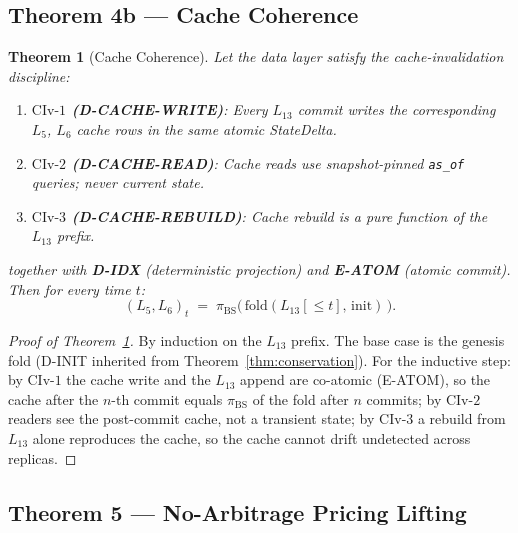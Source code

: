 \documentclass[11pt,a4paper]{article}
\newtheorem{theorem}[definition]{Theorem}
\begin{document}
\subsection{Theorem 4b --- Cache Coherence}
\label{sec:thm-cache}

\begin{theorem}[Cache Coherence]
\label{thm:cache-coh}
Let the data layer satisfy the cache-invalidation discipline:
\begin{enumerate}[nosep]
\item \textbf{$\mathrm{CIv}\textrm{-}1$ (D-CACHE-WRITE)}: Every $L_{13}$ commit writes the corresponding $L_5$, $L_6$ cache rows in the same atomic StateDelta.
\item \textbf{$\mathrm{CIv}\textrm{-}2$ (D-CACHE-READ)}: Cache reads use snapshot-pinned \texttt{as\_of} queries; never current state.
\item \textbf{$\mathrm{CIv}\textrm{-}3$ (D-CACHE-REBUILD)}: Cache rebuild is a pure function of the $L_{13}$ prefix.
\end{enumerate}
together with \textbf{D-IDX} (deterministic projection) and \textbf{E-ATOM} (atomic commit). Then for every time $t$:
\[
(L_5, L_6)_t \;=\; \pi_{\mathrm{BS}}\bigl(\,\mathrm{fold}(L_{13}[\le t],\,\text{init})\,\bigr).
\]
\end{theorem}

\begin{proof}[Proof of Theorem~\ref{thm:cache-coh}]
By induction on the $L_{13}$ prefix. The base case is the genesis fold (D-INIT inherited from Theorem~\ref{thm:conservation}). For the inductive step: by $\mathrm{CIv}\textrm{-}1$ the cache write and the $L_{13}$ append are co-atomic (E-ATOM), so the cache after the $n$-th commit equals $\pi_{\mathrm{BS}}$ of the fold after $n$ commits; by $\mathrm{CIv}\textrm{-}2$ readers see the post-commit cache, not a transient state; by $\mathrm{CIv}\textrm{-}3$ a rebuild from $L_{13}$ alone reproduces the cache, so the cache cannot drift undetected across replicas. \qedhere
\end{proof}

\subsection{Theorem 5 --- No-Arbitrage Pricing Lifting}
\label{sec:thm-noarb}
\end{document}
